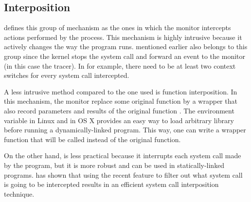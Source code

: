 \subsection{Interposition}

\citet{juvePracticalResourceMonitoring2015} defines this group of mechanism as the ones in which the monitor intercepts actions performed by the process.
This mechanism is highly intrusive because it actively changes the way the program runs.
 mentioned earlier also belongs to this group since the kernel stops the system call and forward an event to the monitor (in this case the tracer).
In  for example, there need to be at least two context switches for every system call intercepted.


A less intrusive method compared to the one  used is function interposition.
In this mechanism, the monitor replace some original function by a wrapper that also record parameters and results of the original function \citep{juvePracticalResourceMonitoring2015}.
The environment variable  in Linux and  in OS X provides an easy way to load arbitrary library before running a dynamically-linked program.
This way, one can write a wrapper function that will be called instead of the original function.

On the other hand,  is less practical because it interrupts each system call made by the program, but it is more robust and can be used in statically-linked programs.
\citet{kimPracticalEffectiveSandboxing2013} has shown that using the recent  feature to filter out what system call is going to be intercepted results in an efficient system call interposition technique.

